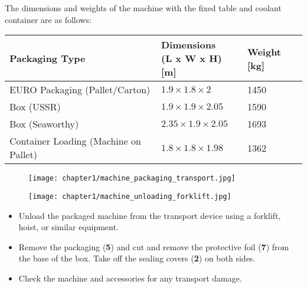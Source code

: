 
The dimensions and weights of the machine with the fixed table and coolant container are as follows:

\begin{table}[h]
\centering
\begin{tabular}{lll}
\textbf{Packaging Type} & \makecell{\textbf{Dimensions}\\\textbf{(L x W x H) [m]}} & \textbf{Weight [kg]} \\ \hline
EURO Packaging (Pallet/Carton) & $1.9 \times 1.8 \times 2$ & 1450 \\
Box (USSR) & $1.9 \times 1.9 \times 2.05$ & 1590 \\
Box (Seaworthy) & $2.35 \times 1.9 \times 2.05$ & 1693 \\
Container Loading (Machine on Pallet) & $1.8 \times 1.8 \times 1.98$ & 1362 \\
\end{tabular}
\end{table}

\begin{figure}[h]
    \centering
    \begin{minipage}[b]{0.35\textwidth} %
        \centering
        \texttt{[image: chapter1/machine\_packaging\_transport.jpg]} %
        \caption{}
        \label{fig:packaging}
    \end{minipage}
    \hfill
    \begin{minipage}[b]{0.55\textwidth} %
        \centering
        \texttt{[image: chapter1/machine\_unloading\_forklift.jpg]} %
        \caption{}
        \label{fig:unloading}
    \end{minipage}
\end{figure}

\begin{itemize}
    \item Unload the packaged machine from the transport device using a forklift, hoist, or similar equipment.
    \item Remove the packaging (\textbf{5}) and cut and remove the protective foil (\textbf{7}) from the base of the box. Take off the sealing covers (\textbf{2}) on both sides.
    \item Check the machine and accessories for any transport damage.
\end{itemize}

